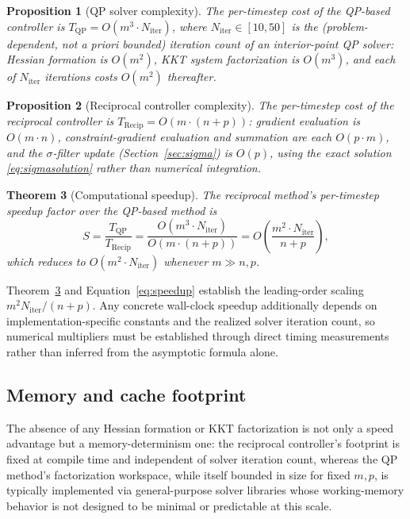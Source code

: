 \documentclass[11pt,onecolumn]{article}
\newtheorem{theorem}{Theorem}[section]
\newtheorem{proposition}[theorem]{Proposition}
\theoremstyle{definition}
\theoremstyle{remark}
\begin{document}
\begin{proposition}[QP solver complexity]
The per-timestep cost of the QP-based controller is $T_{\mathrm{QP}} = O(m^3 \cdot N_{\mathrm{iter}})$,
where $N_{\mathrm{iter}} \in [10, 50]$ is the (problem-dependent, not a priori bounded)
iteration count of an interior-point QP solver: Hessian formation is $O(m^2)$, KKT system
factorization is $O(m^3)$, and each of $N_{\mathrm{iter}}$ iterations costs $O(m^2)$ thereafter.
\end{proposition}

\begin{proposition}[Reciprocal controller complexity]
The per-timestep cost of the reciprocal controller is $T_{\mathrm{Recip}} = O(m \cdot (n+p))$:
gradient evaluation is $O(m \cdot n)$, constraint-gradient evaluation and summation are each
$O(p \cdot m)$, and the $\sigma$-filter update (Section~\ref{sec:sigma}) is $O(p)$, using the
exact solution \eqref{eq:sigmasolution} rather than numerical integration.
\end{proposition}

\begin{theorem}[Computational speedup] \label{thm:speedup}
The reciprocal method's per-timestep speedup factor over the QP-based method is
\begin{equation}
S = \frac{T_{\mathrm{QP}}}{T_{\mathrm{Recip}}}
  = \frac{O(m^3 \cdot N_{\mathrm{iter}})}{O(m \cdot (n+p))}
  = O\!\left(\frac{m^2 \cdot N_{\mathrm{iter}}}{n+p}\right), \label{eq:speedup}
\end{equation}
which reduces to $O(m^2 \cdot N_{\mathrm{iter}})$ whenever $m \gg n, p$.
\end{theorem}

Theorem~\ref{thm:speedup} and Equation~\eqref{eq:speedup} establish the leading-order scaling
$m^2 N_{\mathrm{iter}}/(n+p)$. Any concrete wall-clock speedup additionally depends on
implementation-specific constants and the realized solver iteration count, so numerical
multipliers must be established through direct timing measurements rather than inferred from
the asymptotic formula alone.


\subsection{Memory and cache footprint}
The absence of any Hessian formation or KKT factorization is not only a speed advantage but a
memory-determinism one: the reciprocal controller's footprint is fixed at compile time and
independent of solver iteration count, whereas the QP method's factorization workspace, while
itself bounded in size for fixed $m, p$, is typically implemented via general-purpose solver
libraries whose working-memory behavior is not designed to be minimal or predictable at this
scale.
\end{document}
